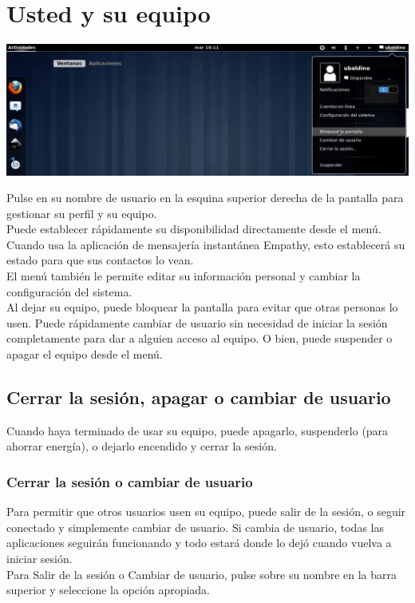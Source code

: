 \section{Usted y su equipo}
\begin{center}
\includegraphics[scale=0.45]{img/usuario.png} 
\end{center}
Pulse en su nombre de usuario en la esquina superior derecha de la pantalla para gestionar su perfil y su equipo.\\
Puede establecer rápidamente su disponibilidad directamente desde el menú. Cuando usa la aplicación de mensajería instantánea Empathy, esto establecerá su estado para que sus contactos lo vean.\\

El menú también le permite editar su información personal y cambiar la configuración del sistema.\\

Al dejar su equipo, puede bloquear la pantalla para evitar que otras personas lo usen. Puede rápidamente cambiar de usuario sin necesidad de iniciar la sesión completamente para dar a alguien acceso al equipo. O bien, puede suspender o apagar el equipo desde el menú.
\subsection{Cerrar la sesión, apagar o cambiar de usuario}
Cuando haya terminado de usar su equipo, puede apagarlo, suspenderlo (para ahorrar energía), o dejarlo encendido y cerrar la sesión.
\subsubsection{Cerrar la sesión o cambiar de usuario}
Para permitir que otros usuarios usen su equipo, puede salir de la sesión, o seguir conectado y simplemente cambiar de usuario. Si cambia de usuario, todas las aplicaciones seguirán funcionando y todo estará donde lo dejó cuando vuelva a iniciar sesión.\\
Para Salir de la sesión o Cambiar de usuario, pulse sobre su nombre en la barra superior y seleccione la opción apropiada.
